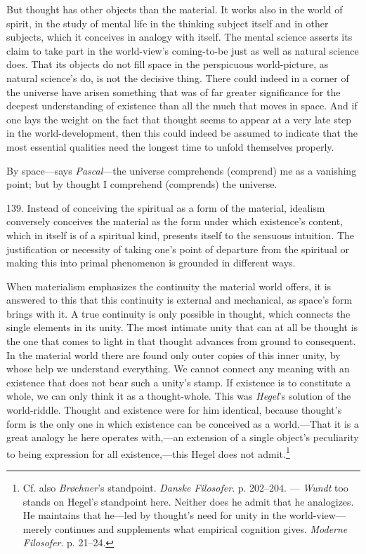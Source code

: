 \documentclass[12pt,a4paper]{book}
\newcommand{\opage}[1]{\marginnote{\footnotesize\textit{[#1]}}}
\begin{document}
But thought has other objects than the material. It works also in the world of spirit, in the
study of mental life in the thinking subject itself and in other subjects, which it conceives in
analogy with itself. The mental science asserts its claim to take part in the world-view's coming-to-be just as well as natural science does. That its objects do not fill space in the perspicuous
world-picture, as natural science's do, is not the decisive thing. There could indeed in a corner
of the universe have arisen something that was of far greater significance for the deepest
understanding of existence than all the much that moves in space. And if one lays the weight on the
fact that thought seems to appear at a very late step in the world-development, then this could
indeed \opage{333}be assumed to indicate that the most essential qualities need the longest time to unfold
themselves properly.

By space---says \emph{Pascal}---the universe comprehends (comprend) me as a vanishing point; but by
thought I comprehend (comprends) the universe.

139. Instead of conceiving the spiritual as a form of the material, idealism conversely conceives
the material as the form under which existence's content, which in itself is of a spiritual kind,
presents itself to the sensuous intuition. The justification or necessity of taking one's point of
departure from the spiritual or making this into primal phenomenon is grounded in different ways.

When materialism emphasizes the continuity the material world offers, it is answered to this that
this continuity is external and mechanical, as space's form brings with it. A true continuity is
only possible in thought, which connects the single elements in its unity. The most intimate unity
that can at all be thought is the one that comes to light in that thought advances from ground to
consequent. In the material world there are found only outer copies of this inner unity, by whose
help we understand everything. We cannot connect any meaning with an existence that does not bear
such a unity's stamp. If existence is to constitute a whole, we can only think it as a
thought-whole. This was \emph{Hegel}'s solution of the world-riddle. Thought and existence were for him identical, because thought's form is the only one in which existence can be conceived as a
world.---That it is a great analogy he here operates with,---an extension of a single object's
peculiarity to being expression for all existence,---this Hegel does not admit.\footnote{Cf. also
\emph{Brøchner}'s standpoint. \emph{Danske Filosofer}. p. 202--204. --- \emph{Wundt} too stands on
Hegel's standpoint here. Neither does he admit that he analogizes. He maintains that he---led by
thought's need for unity in the world-view---merely continues and supplements what empirical
cognition gives. \emph{Moderne Filosofer}. p. 21--24.}
\end{document}

